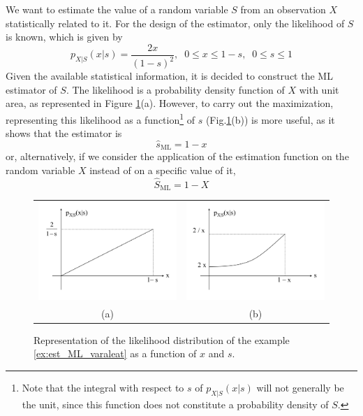 \begin{example}[ML Estimation]
\label{ex:est_ML_varaleat}

We want to estimate the value of a random variable $S$ from an observation $X$ statistically related to it. For the design of the estimator, only the likelihood of $S$ is known, which is given by
\begin{equation}
p_{X|S}(x|s) = \frac{2 x}{(1 - s)^2},\;\; 0 \le x \le 1-s,\;\; 0 \le s \le 1
\end{equation}
Given the available statistical information, it is decided to construct the ML estimator of $S$. The likelihood is a probability density function of $X$ with unit area, as represented in Figure \ref{fig:est_ML_caso1}(a). However, to carry out the maximization, representing this likelihood as a function\footnote{Note that the integral with respect to $s$ of $p_{X|S}(x|s)$ will not generally be the unit, since this function does not constitute a probability density of $S$.} of $s$ (Fig.\ref{fig:est_ML_caso1}(b)) is more useful, as it shows that the estimator is
$$\hat s_{\text{ML}} = 1 - x$$
or, alternatively, if we consider the application of the estimation function on the random variable $X$ instead of on a specific value of it,
$$\hat S_{\text{ML}} = 1 - X$$

\begin{figure}[t]
  \begin{center}
  \begin{tabular}{cc}
    \includegraphics[width=6cm]{Figures//px_s_funcionx.png} &
   
   \includegraphics[width=6cm]{Figures//px_s_funcions.png}\\
    (a) & (b)
  \end{tabular}
    \caption{Representation of the likelihood distribution of the example \ref{ex:est_ML_varaleat} as a function of $x$ and $s$.}
    \label{fig:est_ML_caso1}
  \end{center}
\end{figure}

\end{example}

